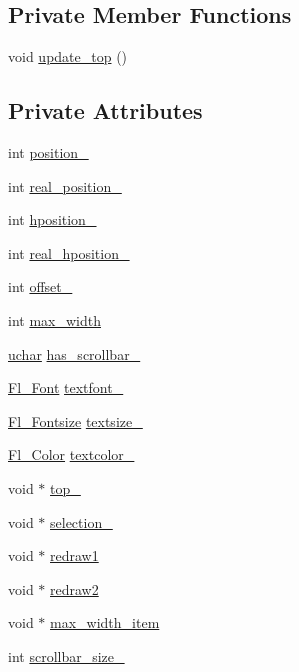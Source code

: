 \subsection*{Private Member Functions}
\begin{DoxyCompactItemize}
\item 
void \hyperlink{class_fl___browser___a122a2aa4ad005096b627f80522b4af30}{update\+\_\+top} ()
\end{DoxyCompactItemize}
\subsection*{Private Attributes}
\begin{DoxyCompactItemize}
\item 
int \hyperlink{class_fl___browser___a42ebd2ebdf27d127c5761d83c6117896}{position\+\_\+}
\item 
int \hyperlink{class_fl___browser___a94838051983c0bc05c062fc165293ae1}{real\+\_\+position\+\_\+}
\item 
int \hyperlink{class_fl___browser___ac85a7d5443dc80ec303235d0e73f6e1d}{hposition\+\_\+}
\item 
int \hyperlink{class_fl___browser___a4fbe438fdc6307c625564ac6b129c0b6}{real\+\_\+hposition\+\_\+}
\item 
int \hyperlink{class_fl___browser___a0eeaec2d2c9203a0bba760fd7964ea0a}{offset\+\_\+}
\item 
int \hyperlink{class_fl___browser___a85d8605cbd2f69cd1e6bf425ee2397ab}{max\+\_\+width}
\item 
\hyperlink{fl__types_8h_a65f85814a8290f9797005d3b28e7e5fc}{uchar} \hyperlink{class_fl___browser___aeaeeb512d94e2f1d1e0cabdf371fa484}{has\+\_\+scrollbar\+\_\+}
\item 
\hyperlink{_enumerations_8_h_a2ac46d9f082834b969fffe490a03a709}{Fl\+\_\+\+Font} \hyperlink{class_fl___browser___a51e202ee8f00054b29d21f3c446fea58}{textfont\+\_\+}
\item 
\hyperlink{_enumerations_8_h_ad58927f5c691454480f7cd28362502f1}{Fl\+\_\+\+Fontsize} \hyperlink{class_fl___browser___a2c139b34575677afa28dfe093c825782}{textsize\+\_\+}
\item 
\hyperlink{_enumerations_8_h_a8b762953646f8abee866061f1af78a6a}{Fl\+\_\+\+Color} \hyperlink{class_fl___browser___a16df24a8581bfe5fc2875d54fb59fd50}{textcolor\+\_\+}
\item 
void $\ast$ \hyperlink{class_fl___browser___aacdf6ccc00b1046b82ebbb29549e8c9d}{top\+\_\+}
\item 
void $\ast$ \hyperlink{class_fl___browser___a2079bb4f157eeebaac3d9caa3b32c185}{selection\+\_\+}
\item 
void $\ast$ \hyperlink{class_fl___browser___a6c53c2b9d47b93b3c4199d27deaf060f}{redraw1}
\item 
void $\ast$ \hyperlink{class_fl___browser___ab6b6618e0df3dc38440f8c1e5ab6239d}{redraw2}
\item 
void $\ast$ \hyperlink{class_fl___browser___af67016b9a714652a5f97c14455bcb844}{max\+\_\+width\+\_\+item}
\item 
int \hyperlink{class_fl___browser___a1e8bcfe4c5b762d097ca97771f7cac72}{scrollbar\+\_\+size\+\_\+}
\end{DoxyCompactItemize}
